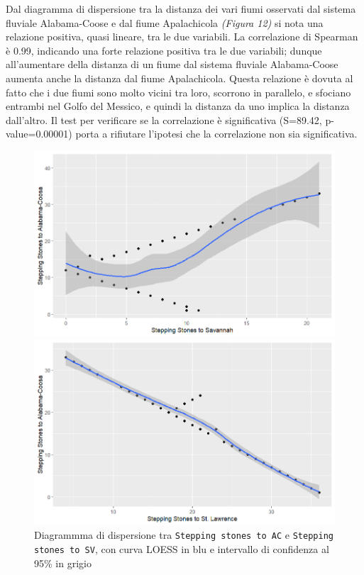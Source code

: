 \documentclass{article} %
\begin{document}
Dal diagramma di dispersione tra la distanza dei vari fiumi osservati dal sistema fluviale Alabama-Coose e dal fiume Apalachicola \textit{(Figura 12)} si nota una relazione positiva, quasi lineare, tra le due variabili.  
La correlazione di Spearman è 0.99, indicando una forte relazione positiva tra le due variabili; dunque all'aumentare della distanza di un fiume dal sistema fluviale Alabama-Coose aumenta anche la distanza dal fiume Apalachicola. 
Questa relazione è dovuta al fatto che i due fiumi sono molto vicini tra loro, scorrono in parallelo, e sfociano entrambi nel Golfo del Messico, e quindi la distanza da uno implica la distanza dall'altro.
Il test per verificare se la correlazione è significativa (S=89.42, p-value=0.00001) porta a rifiutare l'ipotesi che la correlazione non sia significativa.


\begin{figure}[H]
    \centering
    \begin{minipage}{0.49\textwidth}
        \centering
        \includegraphics[width=\textwidth]{immagini/ac_sv.png}
        \captionsetup{justification=centering}
        \caption{Diagrammma di dispersione tra \texttt{Stepping stones to AC} e \texttt{Stepping stones to SV}, con curva LOESS in blu e intervallo di confidenza al 95\% in grigio}
    \end{minipage}
    \hfill
    \begin{minipage}{0.49\textwidth}
        \centering
        \includegraphics[width=\textwidth]{immagini/ac_sl.png}

\end{minipage}
\end{figure}
\end{document}
